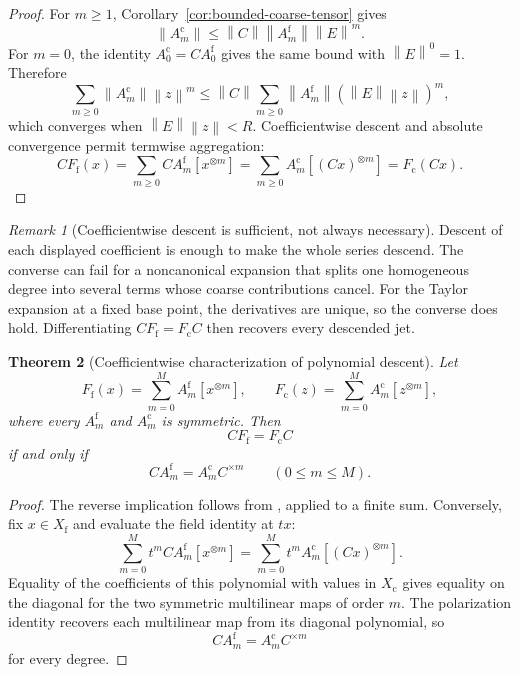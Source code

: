 \documentclass[11pt]{article}
\newtheorem{theorem}{Theorem}[section]
\theoremstyle{definition}
\theoremstyle{remark}
\newtheorem{remark}[theorem]{Remark}
\newcommand{\norm}[1]{\left\lVert #1\right\rVert}
\newcommand{\fine}{\mathrm f}
\newcommand{\coarse}{\mathrm c}
\begin{document}
\begin{proof}
For $m\geq1$, Corollary~\ref{cor:bounded-coarse-tensor} gives
\[
  \norm{A_m^{\coarse}}
  \leq
  \norm{C}\norm{A_m^{\fine}}\norm{E}^m.
\]
For $m=0$, the identity $A_0^{\coarse}=CA_0^{\fine}$ gives the same bound with $\norm{E}^0=1$.
Therefore
\[
  \sum_{m\geq0}\norm{A_m^{\coarse}}\norm{z}^m
  \leq
  \norm{C}
  \sum_{m\geq0}
  \norm{A_m^{\fine}}
  (\norm{E}\norm{z})^m,
\]
which converges when $\norm{E}\norm{z}<R$.  Coefficientwise descent and absolute convergence permit termwise aggregation:
\[
  CF_{\fine}(x)
  =\sum_{m\geq0}CA_m^{\fine}[x^{\otimes m}]
  =\sum_{m\geq0}A_m^{\coarse}[(Cx)^{\otimes m}]
  =F_{\coarse}(Cx).
\]
\end{proof}

\begin{remark}[Coefficientwise descent is sufficient, not always necessary]
Descent of each displayed coefficient is enough to make the whole series descend.  The converse can fail for a noncanonical expansion that splits one homogeneous degree into several terms whose coarse contributions cancel.  For the Taylor expansion at a fixed base point, the derivatives are unique, so the converse does hold.  Differentiating $CF_{\fine}=F_{\coarse}C$ then recovers every descended jet.
\end{remark}

\begin{theorem}[Coefficientwise characterization of polynomial descent]\label{thm:polynomial-coefficientwise}
Let
\[
  F_{\fine}(x)=\sum_{m=0}^{M}A_m^{\fine}[x^{\otimes m}],
  \qquad
  F_{\coarse}(z)=\sum_{m=0}^{M}A_m^{\coarse}[z^{\otimes m}],
\]
where every $A_m^{\fine}$ and $A_m^{\coarse}$ is symmetric.  Then
\[
  CF_{\fine}=F_{\coarse}C
\]
if and only if
\[
  CA_m^{\fine}=A_m^{\coarse}C^{\times m}
  \qquad(0\leq m\leq M).
\]
\end{theorem}

\begin{proof}
The reverse implication follows from , applied to a finite sum.  Conversely, fix $x\in X_{\fine}$ and evaluate the field identity at $tx$:
\[
  \sum_{m=0}^{M}t^mCA_m^{\fine}[x^{\otimes m}]
  =
  \sum_{m=0}^{M}t^mA_m^{\coarse}[(Cx)^{\otimes m}].
\]
Equality of the coefficients of this polynomial with values in $X_{\coarse}$ gives equality on the diagonal for the two symmetric multilinear maps of order $m$.  The polarization identity recovers each multilinear map from its diagonal polynomial, so
\[
  CA_m^{\fine}=A_m^{\coarse}C^{\times m}
\]
for every degree.
\end{proof}
\end{document}
